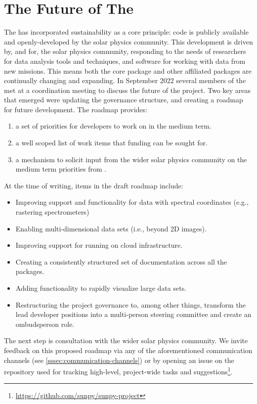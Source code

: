 \section{The Future of The \sunpyproj}
\label{sec:the-future-of-the-sunpyproj}

The \sunpyproj has incorporated sustainability as a core principle: code is publicly available and openly-developed by the solar physics community.
This development is driven by, and for, the solar physics community, responding to the needs of researchers for data analysis tools and techniques, and software for working with data from new missions.
This means both the \sunpypkg core package and other affiliated packages are continually changing and expanding.
In September 2022 several members of the \sunpyproj met at a coordination meeting to discuss the future of the project.
Two key areas that emerged were updating the governance structure, and creating a roadmap for future development.
The roadmap provides:
\begin{enumerate}
    \item a set of priorities for developers to work on in the medium term.
    \item a well scoped list of work items that funding can be sought for.
    \item a mechanism to solicit input from the wider solar physics community on the medium term priorities from \sunpyproj.
\end{enumerate}

At the time of writing, items in the draft roadmap include:
\begin{itemize}
    \item Improving support and functionality for data with spectral coordinates (e.g., rastering spectrometers)
    \item Enabling multi-dimensional data sets (i.e., beyond 2D images).
    \item Improving support for running \sunpypkg on cloud infrastructure.
    \item Creating a consistently structured set of documentation across all the \sunpyproj packages.
    \item Adding functionality to rapidly visualize large data sets.
    \item Restructuring the project governance to, among other things, transform the lead developer positions into a multi-person steering committee and create an ombudsperson role.
\end{itemize}

The next step is consultation with the wider solar physics community.
We invite feedback on this proposed roadmap via any of the aforementioned communication channels (see \autoref{sssec:communication-channels}) or by opening an issue on the repository used for tracking high-level, project-wide tasks and suggestions\footnote{\url{https://github.com/sunpy/sunpy-project}}.
